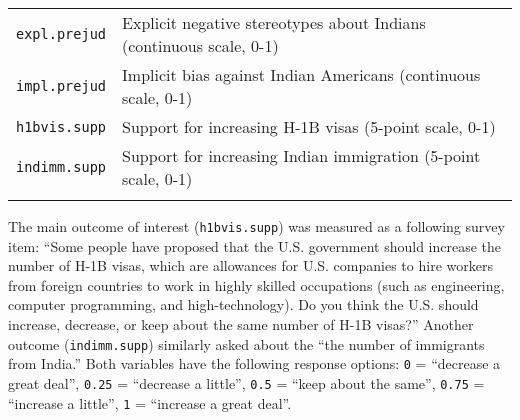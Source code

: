 \documentclass[]{article}
\begin{document}
\begin{longtable}[c]{@{}ll@{}}
\begin{minipage}[t]{0.35\columnwidth}
\texttt{expl.prejud}
\end{minipage} & \begin{minipage}[t]{0.58\columnwidth}\raggedright
Explicit negative stereotypes about Indians (continuous scale, 0-1)
\end{minipage}
\\\addlinespace
\begin{minipage}[t]{0.35\columnwidth}\raggedright
\texttt{impl.prejud}
\end{minipage} & \begin{minipage}[t]{0.58\columnwidth}\raggedright
Implicit bias against Indian Americans (continuous scale, 0-1)
\end{minipage}
\\\addlinespace
\begin{minipage}[t]{0.35\columnwidth}\raggedright
\texttt{h1bvis.supp}
\end{minipage} & \begin{minipage}[t]{0.58\columnwidth}\raggedright
Support for increasing H-1B visas (5-point scale, 0-1)
\end{minipage}
\\\addlinespace
\begin{minipage}[t]{0.35\columnwidth}\raggedright
\texttt{indimm.supp}
\end{minipage} & \begin{minipage}[t]{0.58\columnwidth}\raggedright
Support for increasing Indian immigration (5-point scale, 0-1)
\end{minipage}
\\\addlinespace
\bottomrule
\end{longtable}

The main outcome of interest (\texttt{h1bvis.supp}) was measured as a
following survey item: ``Some people have proposed that the U.S.
government should increase the number of H-1B visas, which are
allowances for U.S. companies to hire workers from foreign countries to
work in highly skilled occupations (such as engineering, computer
programming, and high-technology). Do you think the U.S. should
increase, decrease, or keep about the same number of H-1B visas?''
Another outcome (\texttt{indimm.supp}) similarly asked about the ``the
number of immigrants from India.'' Both variables have the following
response options: \texttt{0} = ``decrease a great deal'', \texttt{0.25}
= ``decrease a little'', \texttt{0.5} = ``keep about the same'',
\texttt{0.75} = ``increase a little'', \texttt{1} = ``increase a great
deal''.
\end{document}
